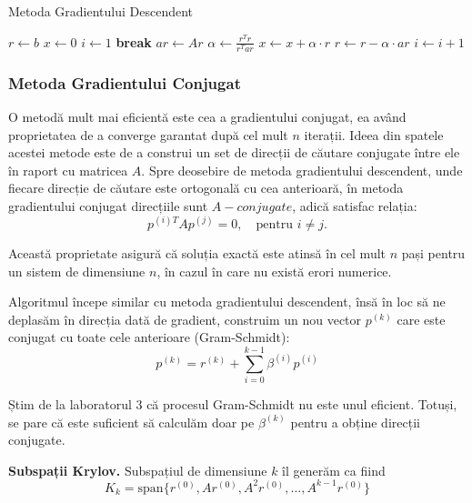 \documentclass{exam}
\begin{document}
\begin{algorithm}
	\caption{Metoda Gradientului Descendent}
	\begin{algorithmic}[1]
		\State $r \gets b$
		\State $x \gets 0$
		\State $i \gets 1$
		\State \textbf{break}
		\EndIf
		\State $ar \gets A r$
		\State $\alpha \gets \frac{r^T r}{r^T ar}$
		\State $x \gets x + \alpha \cdot r$
		\State $r \gets r - \alpha \cdot ar$
		\State $i \gets i + 1$
		\EndWhile
	\end{algorithmic}
\end{algorithm}

\subsubsection{Metoda Gradientului Conjugat}

O metodă mult mai eficientă este cea a gradientului conjugat, ea având
proprietatea de a converge garantat după cel mult $n$ iterații. Ideea din
spatele acestei metode este de a construi un set de direcții de căutare
conjugate între ele în raport cu matricea $A$. Spre deosebire de metoda
gradientului descendent, unde fiecare direcție de căutare este ortogonală cu cea
anterioară, în metoda gradientului conjugat direcțiile sunt $A-conjugate$, adică
satisfac relația:
\begin{equation*}
	p^{(i)T} A p^{(j)} = 0, \quad \text{pentru } i \neq j.
\end{equation*}

Această proprietate asigură că soluția exactă este atinsă în cel mult $n$ pași
pentru un sistem de dimensiune $n$, în cazul în care nu există erori numerice.

Algoritmul începe similar cu metoda gradientului descendent, însă în loc să ne
deplasăm în direcția dată de gradient, construim un nou vector $p^{(k)}$ care
este conjugat cu toate cele anterioare (Gram-Schmidt):
\begin{equation*}
	p^{(k)} = r^{(k)} + \sum_{i=0}^{k-1} \beta^{(i)} p^{(i)}
\end{equation*}

Știm de la laboratorul 3 că procesul Gram-Schmidt nu este unul eficient. Totuși,
se pare că este suficient să calculăm doar pe $\beta^{(k)}$ pentru a obține
direcții conjugate.

\textbf{Subspații Krylov.} Subspațiul de dimensiune $k$ îl generăm ca fiind
\begin{equation*}
	K_k = \text{span}\{r^{(0)}, Ar^{(0)}, A^2 r^{(0)}, \ldots, A^{k-1} r^{(0)}\}
\end{equation*}
\end{document}
